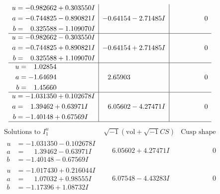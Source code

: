 \documentclass[1p]{elsarticle_modified}
\theoremstyle{definition}
\newcommand{\I}{\sqrt{-1}}
\begin{document}
$$\begin{array}{c|c|c}
\begin{aligned}
u &= -0.982662 + 0.303550 I \\
a &= -0.744825 - 0.890821 I \\
b &= \phantom{-}0.325588 - 1.109070 I\end{aligned}
 & -0.64154 - 2.71485 I & \phantom{-0.000000 } 0 \\ \hline\begin{aligned}
u &= -0.982662 - 0.303550 I \\
a &= -0.744825 + 0.890821 I \\
b &= \phantom{-}0.325588 + 1.109070 I\end{aligned}
 & -0.64154 + 2.71485 I & \phantom{-0.000000 } 0 \\ \hline\begin{aligned}
u &= \phantom{-}1.02854\phantom{ +0.000000I} \\
a &= -1.64694\phantom{ +0.000000I} \\
b &= \phantom{-}1.45660\phantom{ +0.000000I}\end{aligned}
 & \phantom{-}2.65903\phantom{ +0.000000I} & \phantom{-0.000000 } 0 \\ \hline\begin{aligned}
u &= -1.031350 + 0.102678 I \\
a &= \phantom{-}1.39462 + 0.63971 I \\
b &= -1.40148 + 0.67569 I\end{aligned}
 & \phantom{-}6.05602 - 4.27471 I & \phantom{-0.000000 } 0\\
 \hline 
 \end{array}$$\newpage$$\begin{array}{c|c|c}  
\text{Solutions to }I^u_{1}& \I (\text{vol} + \sqrt{-1}CS) & \text{Cusp shape}\\
 \hline 
\begin{aligned}
u &= -1.031350 - 0.102678 I \\
a &= \phantom{-}1.39462 - 0.63971 I \\
b &= -1.40148 - 0.67569 I\end{aligned}
 & \phantom{-}6.05602 + 4.27471 I & \phantom{-0.000000 } 0 \\ \hline\begin{aligned}
u &= -1.017430 + 0.216044 I \\
a &= \phantom{-}1.07032 + 0.98555 I \\
b &= -1.17396 + 1.08732 I\end{aligned}
 & \phantom{-}6.07548 - 4.43283 I & \phantom{-0.000000 } 0 \\ \hline\begin{aligned}

\end{aligned}
\end{array}$$
\end{document}
